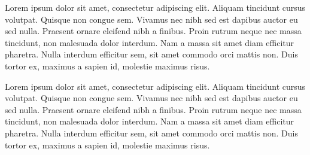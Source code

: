 
\begin{Exercise}[
name={},
title={}, 
difficulty=0,
origin={Place Holder}]

Lorem ipsum dolor sit amet, consectetur adipiscing elit. Aliquam tincidunt cursus volutpat. Quisque non congue sem. Vivamus nec nibh sed est dapibus auctor eu sed nulla. Praesent ornare eleifend nibh a finibus. Proin rutrum neque nec massa tincidunt, non malesuada dolor interdum. Nam a massa sit amet diam efficitur pharetra. Nulla interdum efficitur sem, sit amet commodo orci mattis non. Duis tortor ex, maximus a sapien id, molestie maximus risus. 

\end{Exercise}

\begin{Answer}
Lorem ipsum dolor sit amet, consectetur adipiscing elit. Aliquam tincidunt cursus volutpat. Quisque non congue sem. Vivamus nec nibh sed est dapibus auctor eu sed nulla. Praesent ornare eleifend nibh a finibus. Proin rutrum neque nec massa tincidunt, non malesuada dolor interdum. Nam a massa sit amet diam efficitur pharetra. Nulla interdum efficitur sem, sit amet commodo orci mattis non. Duis tortor ex, maximus a sapien id, molestie maximus risus. 

\end{Answer}
